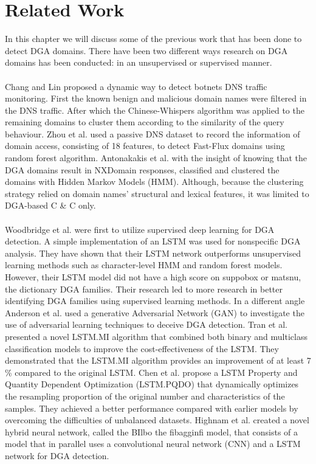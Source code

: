 \chapter{Related Work}\label{relatedwork}
In this chapter we will discuss some of the previous work that has been done to detect DGA domains. 
There have been two different ways research on DGA domains has been conducted: in an unsupervised or supervised manner.\\\\ 
Chang and Lin \cite{Chang_Lin} proposed a dynamic way to detect botnets DNS traffic monitoring. First the known benign and malicious domain names were filtered in the DNS traffic.  After which the Chinese-Whispers algorithm was applied to the remaining domains to cluster them according to the similarity of the query behaviour. 
Zhou et al. \cite{Zhou2013DGABasedBD} used a passive DNS dataset to record the information of domain access, consisting of 18 features, to detect Fast-Flux domains using random forest algorithm. 
Antonakakis et al. \cite{Antonakakis} with the insight of knowing that  the DGA domains result in NXDomain responses, classified and clustered the domains with Hidden Markov Models (HMM). Although, because the clustering strategy relied on domain names’ structural and lexical features, it was limited to DGA-based C \& C only.\\\\ 
Woodbridge et al. \cite{WoodbridgeAAG16} were first to utilize supervised deep learning for DGA detection. A simple implementation of an LSTM was used for nonspecific DGA analysis. They have shown that their LSTM network outperforms unsupervised learning methods such as character-level HMM and random forest models. However, their LSTM model did not have a high score on suppobox or matsnu, the dictionary DGA families. Their research led to more research in better identifying DGA families using supervised learning methods. 
In a different angle Anderson et al. used a generative Adversarial Network (GAN) to investigate the use of adversarial learning techniques to deceive DGA detection.
Tran et al. \cite{TRAN20182401} presented a novel LSTM.MI algorithm that combined both binary and multiclass classification models to improve the cost-effectiveness of the LSTM. They demonstrated that the LSTM.MI algorithm provides an improvement of at least 7 \% compared to the original LSTM.
Chen et al. \cite{Chen} propose a LSTM Property and Quantity Dependent Optimization (LSTM.PQDO) that dynamically optimizes the resampling proportion of the original number and characteristics of the samples. They achieved a better performance compared with earlier models by overcoming the difficulties of unbalanced datasets.
Highnam et al. created a novel hybrid neural network, called the BIlbo the fibagginfi model, that consists of a model that in parallel uses a convolutional neural network (CNN) and a LSTM network for DGA detection. 
